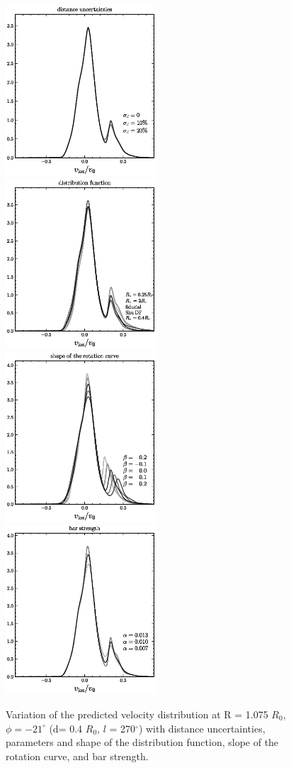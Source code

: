 \documentclass[12pt,preprint]{aastex}
\newcommand{\Ro}{\ensuremath{R_0}}
\begin{document}
\clearpage
\begin{figure}
\includegraphics[width=0.5\textwidth]{distuncertain.ps}
\includegraphics[width=0.5\textwidth]{df.ps}\\
\includegraphics[width=0.5\textwidth]{slope.ps}
\includegraphics[width=0.5\textwidth]{barstrength.ps}
\caption{Variation of the predicted velocity distribution at R = 1.075
  \Ro , $\phi = -21^{\circ}$ (d= 0.4 \Ro, $l$ = 270$^{\circ}$) with
  distance uncertainties, parameters and shape of the distribution
  function, slope of the rotation curve, and bar
  strength.}\label{fig:1dvar}
\end{figure}
\end{document}
